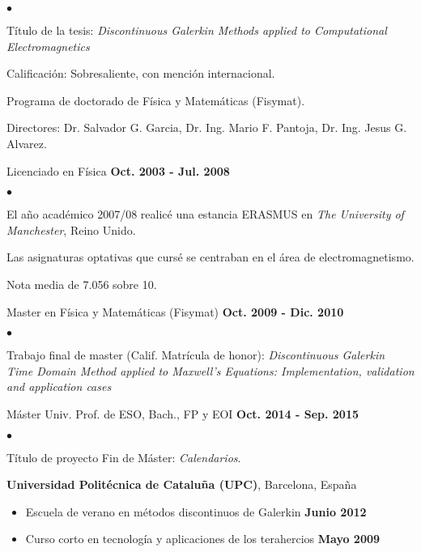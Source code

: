 \documentclass[a4paper,margin,line]{res}
\newenvironment{list2}{
  \begin{list}{$\bullet$}{%
      \setlength{\itemsep}{0in}
      \setlength{\parsep}{0in} \setlength{\parskip}{0in}
      \setlength{\topsep}{0in} \setlength{\partopsep}{0in} 
      \setlength{\leftmargin}{0.2in}}}{\end{list}}
\begin{document}
\begin{resume}
\begin{itemize}
\begin{list2}
  \item[-] Título de la tesis: {\it Discontinuous Galerkin Methods applied to Computational Electromagnetics}
  \item[-] Calificación: Sobresaliente, con mención internacional.
  \item[-] Programa de doctorado de Física y Matemáticas (Fisymat).
  \item[-] Directores:  Dr. Salvador G. Garcia, Dr. Ing. Mario F. Pantoja, Dr. Ing. Jesus G. Alvarez.
 \end{list2}
\vspace*{.1in}
\item Licenciado en Física  \hfill {\raggedleft \bf Oct. 2003 - Jul. 2008}
 \begin{list2}
  \item[-] El año académico 2007/08 realicé una estancia ERASMUS en {\it The University of Manchester}, Reino Unido.
  \item[-] Las asignaturas optativas que cursé se centraban en el área de  electromagnetismo.
  \item[-] Nota media de 7.056 sobre 10. 
 \end{list2}
\vspace*{.1in}
 \item  Master en Física y Matemáticas (Fisymat) \hfill {\raggedleft \bf Oct. 2009 - Dic. 2010}
 \begin{list2}
  \item[-] Trabajo final de master (Calif. Matrícula de honor): {\it Discontinuous Galerkin Time
  Domain Method applied to Maxwell’s Equations: Implementation, validation and application cases}
 \end{list2}
\vspace*{.1in}
 \item Máster Univ. Prof. de ESO, Bach., FP y EOI \hfill {\raggedleft \bf Oct. 2014 - Sep. 2015}
 \begin{list2}
  \item[-] Título de proyecto Fin de Máster: \textit{Calendarios}.
 \end{list2}
\end{itemize}

\begin{minipage}{\textwidth}
{\bf Universidad Politécnica de Cataluña (UPC)}, Barcelona, España\\
\vspace*{-.1in}
\begin{itemize}
\item Escuela de verano en métodos discontinuos de Galerkin  \hfill {\bf Junio 2012}
\item Curso corto en tecnología y aplicaciones de los terahercios \hfill {\bf Mayo 2009}
\end{itemize}
\end{minipage}


\end{resume}
\end{document}

